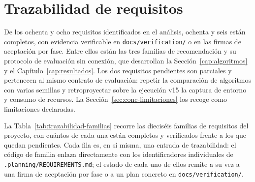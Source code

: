 \section{Trazabilidad de requisitos}\label{sec:req-trazabilidad}

De los ochenta y ocho requisitos identificados en el análisis, ochenta y seis están
completos, con evidencia verificable en \texttt{docs/verification/} o en las firmas de
aceptación por fase. Entre ellos están las tres familias de recomendación y su protocolo de evaluación
sin conexión, que desarrollan la Sección~\ref{cap:algoritmos} y el Capítulo~\ref{cap:resultados}.
Los dos requisitos pendientes son parciales y pertenecen al mismo contrato de evaluación:
repetir la comparación de algoritmos con varias semillas y retroproyectar sobre la ejecución
v15 la captura de entorno y consumo de recursos. La Sección~\ref{sec:conc-limitaciones} los
recoge como limitaciones declaradas.

La Tabla~\ref{tab:trazabilidad-familias} recorre las dieciséis familias de requisitos del
proyecto, con cuántos de cada una están completos y verificados frente a los que quedan
pendientes. Cada fila es, en sí misma, una entrada de trazabilidad: el código de familia enlaza
directamente con los identificadores individuales de \texttt{.planning/REQUIREMENTS.md}; el
estado de cada uno de ellos remite a su vez a una firma de aceptación por fase o a un plan
concreto en \texttt{docs/verification/}.

